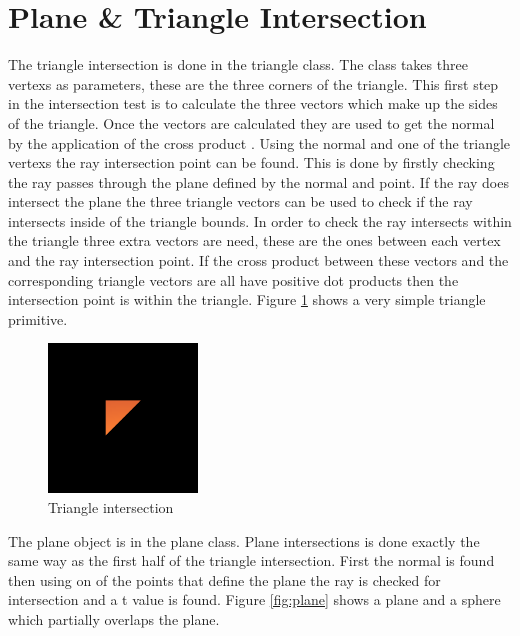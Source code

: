 \documentclass{article}
\begin{document}
\section{Plane \& Triangle Intersection}

The triangle intersection is done in the triangle class. The class takes three
vertexs as parameters, these are the three corners of the triangle. This first step in the
intersection test is to calculate the three vectors which make up the sides
of the triangle. Once the vectors are calculated they are used to get the normal by the application of the
cross product \cite{triangle}. Using the normal and one of the triangle vertexs
the ray intersection point can be found. This is done by firstly checking the ray
passes through the plane defined by the normal and point. If the ray does intersect
the plane the three triangle vectors can be used to check if the ray intersects
inside of the triangle bounds. In order to check the ray intersects within the
triangle three extra vectors are need, these are the ones between each vertex and
the ray intersection point. If the cross product between these vectors and the
corresponding triangle vectors are all have positive dot products then the intersection
point is within the triangle. Figure \ref{fig:triint} shows a very simple triangle
primitive.\\

\begin{figure}[H]
  \begin{center}
  \includegraphics[width=150px]{Images/triangle.png}
  \caption{Triangle intersection}
  \label{fig:triint}
  \end{center}
\end{figure}

The plane object is in the plane class. Plane intersections is done exactly the
same way as the first half of the triangle intersection. First the normal is found
then using on of the points that define the plane the ray is checked for intersection
and a t value is found. Figure \ref{fig:plane} shows a plane and a sphere which
partially overlaps the plane.
\end{document}
